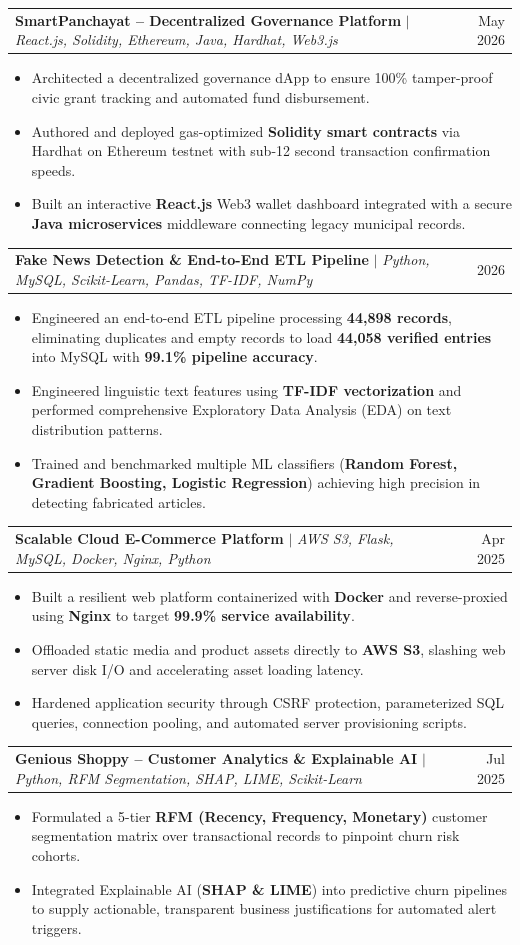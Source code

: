\documentclass[letterpaper,11pt]{article}
\makeatletter
\newcommand{\resumeItem}[1]{
  \item\small{
    {#1 \vspace{-2pt}}
  }
}
\newcommand{\resumeProjectHeading}[2]{
    \item
    \begin{tabular*}{0.97\textwidth}{l@{\extracolsep{\fill}}r}
      \small#1 & #2 \\
    \end{tabular*}\vspace{-7pt}
}
\newcommand{\resumeItemListStart}{\begin{itemize}}
\newcommand{\resumeItemListEnd}{\end{itemize}\vspace{-5pt}}
\makeatother
\begin{document}
      \resumeProjectHeading
          {\textbf{SmartPanchayat -- Decentralized Governance Platform} $|$ \emph{React.js, Solidity, Ethereum, Java, Hardhat, Web3.js}}{May 2026}
          \resumeItemListStart
            \resumeItem{Architected a decentralized governance dApp to ensure 100\% tamper-proof civic grant tracking and automated fund disbursement.}
            \resumeItem{Authored and deployed gas-optimized \textbf{Solidity smart contracts} via Hardhat on Ethereum testnet with sub-12 second transaction confirmation speeds.}
            \resumeItem{Built an interactive \textbf{React.js} Web3 wallet dashboard integrated with a secure \textbf{Java microservices} middleware connecting legacy municipal records.}
          \resumeItemListEnd

      \resumeProjectHeading
          {\textbf{Fake News Detection \& End-to-End ETL Pipeline} $|$ \emph{Python, MySQL, Scikit-Learn, Pandas, TF-IDF, NumPy}}{2026}
          \resumeItemListStart
            \resumeItem{Engineered an end-to-end ETL pipeline processing \textbf{44,898 records}, eliminating duplicates and empty records to load \textbf{44,058 verified entries} into MySQL with \textbf{99.1\% pipeline accuracy}.}
            \resumeItem{Engineered linguistic text features using \textbf{TF-IDF vectorization} and performed comprehensive Exploratory Data Analysis (EDA) on text distribution patterns.}
            \resumeItem{Trained and benchmarked multiple ML classifiers (\textbf{Random Forest, Gradient Boosting, Logistic Regression}) achieving high precision in detecting fabricated articles.}
          \resumeItemListEnd

      \resumeProjectHeading
          {\textbf{Scalable Cloud E-Commerce Platform} $|$ \emph{AWS S3, Flask, MySQL, Docker, Nginx, Python}}{Apr 2025}
          \resumeItemListStart
            \resumeItem{Built a resilient web platform containerized with \textbf{Docker} and reverse-proxied using \textbf{Nginx} to target \textbf{99.9\% service availability}.}
            \resumeItem{Offloaded static media and product assets directly to \textbf{AWS S3}, slashing web server disk I/O and accelerating asset loading latency.}
            \resumeItem{Hardened application security through CSRF protection, parameterized SQL queries, connection pooling, and automated server provisioning scripts.}
          \resumeItemListEnd

      \resumeProjectHeading
          {\textbf{Genious Shoppy -- Customer Analytics \& Explainable AI} $|$ \emph{Python, RFM Segmentation, SHAP, LIME, Scikit-Learn}}{Jul 2025}
          \resumeItemListStart
            \resumeItem{Formulated a 5-tier \textbf{RFM (Recency, Frequency, Monetary)} customer segmentation matrix over transactional records to pinpoint churn risk cohorts.}
            \resumeItem{Integrated Explainable AI (\textbf{SHAP \& LIME}) into predictive churn pipelines to supply actionable, transparent business justifications for automated alert triggers.}
          \resumeItemListEnd
\end{document}
